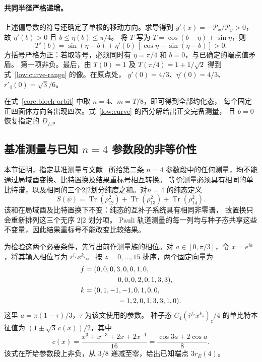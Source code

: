 \paragraph{共同半径严格递增。}
上述偏导数的符号还确定了单根的移动方向。求导得到 $y'(x)=-\mathcal P_x/\mathcal P_y>0$，故
$\eta'(b)>0$ 且 $b\le \eta(b)\le\pi/4$。
将 $T$ 写为 $T=\cos(b-\eta)+\sin \eta$，则
\begin{equation}
 T'(b)=\sin(\eta-b)+\eta'(b)\,[\cos \eta-\sin(\eta-b)]>0.
 \label{low:monotone}
\end{equation}
方括号严格为正：若取等号，必须同时有 $\eta=\pi/4$ 和 $b=0$，与已确定的端点值矛盾。
第一项非负。最后，由 $T(0)=1$ 及 $T(\pi/4)=1+1/\sqrt2$
得到式~\eqref{low:curve-range} 的像。在原点处，
$y'(0)=4/3$、$\eta'(0)=4/3$、$r'_4(0)=\sqrt3/6$。

在式~\eqref{core:bloch-orbit} 中取 $n=4$、$m=T/8$，即可得到全部约化态，
每个固定正四面体方向各出现四次。式~\eqref{low:curve} 的酉分解给出正交完备测量，
且 $b=0$ 恢复指定的 $D_{f_0}$。

\subsection{基准测量与已知 \texorpdfstring{$n=4$}{n=4} 参数段的非等价性}
\label{low:app-invariant}

本节证明，指定基准测量与文献~\cite{PauwelsGisin2026} 所给第二条 $n=4$ 参数段中的任何测量，均不能通过局域酉变换、比特置换及结果重标号相互转换。
等价测量必须具有相同的单比特谱，以及相同的三个$2|2$划分纯度之和。对$n=4$ 的纯态定义
\begin{equation}
 S(\psi)=\operatorname{Tr}(\rho_{12}^{2})
 +\operatorname{Tr}(\rho_{13}^{2})
 +\operatorname{Tr}(\rho_{14}^{2}).
 \label{low:purity-invariant}
\end{equation}
该和在局域酉及比特置换下不变：纯态的互补子系统具有相同非零谱，
故置换只会重新排列这三个无序 $2|2$ 划分项。
Pauli 轨道测量的每一列均与种子态共享这些不变量，因此结果重标号不能改变比较结果。

为检验这两个必要条件，先写出前作测量族的相位。对 $a\in[0,\pi/3]$，令 $x=e^{ia}$，将其输入相位写为 $i^{f_z}x^{k_z}$。
按 $z=0,\ldots,15$ 排序，两个固定向量为
\begin{align}
 f={}&(0,0,0,3,0,0,1,0,\nonumber\\
 &\hspace{12mm}0,0,0,2,0,1,3,3),\nonumber\\
 k={}&(0,1,-1,-1,0,1,0,0,\nonumber\\
 &\hspace{12mm}-1,2,0,1,3,3,1,0).
 \label{low:f159-data}
\end{align}
这里 $a=\pi(1-\tau)/3$，$\tau$ 为该文使用的参数。
种子态 $C_4(i^{f_z}x^{k_z})_z/4$ 的单比特本征值为
$(1\pm\sqrt3\,c(x))/2$，其中
\begin{equation}
 c(x)=\frac{x^3+x^{-3}+2x+2x^{-1}}{16}
 =\frac{\cos3a+2\cos a}{8}.
 \label{low:f159-component}
\end{equation}
该式在所给参数段上非负，从 $3/8$ 递减至零，给出已知端点 $3r_E(4)$。

